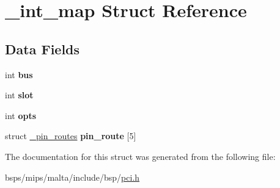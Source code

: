 \hypertarget{struct__int__map}{}\section{\+\_\+int\+\_\+map Struct Reference}
\label{struct__int__map}
\subsection*{Data Fields}
\begin{DoxyCompactItemize}
\item 
\mbox{\label{struct__int__map_a7511193a9cf00d7cb85b575dfb954155}} 
int {\bfseries bus}
\item 
\mbox{\label{struct__int__map_a32e47e1ae9738ea193451df31ee1490d}} 
int {\bfseries slot}
\item 
\mbox{\label{struct__int__map_a8c6b4429bf03063a8a54ee26ce636588}} 
int {\bfseries opts}
\item 
\mbox{\label{struct__int__map_a2cd41ba20b0944c90f945b9ece88ddc2}} 
struct \mbox{\hyperlink{struct__pin__routes}{\+\_\+pin\+\_\+routes}} {\bfseries pin\+\_\+route} \mbox{[}5\mbox{]}
\end{DoxyCompactItemize}


The documentation for this struct was generated from the following file\+:\begin{DoxyCompactItemize}
\item 
bsps/mips/malta/include/bsp/\mbox{\hyperlink{bsps_2mips_2malta_2include_2bsp_2pci_8h}{pci.\+h}}\end{DoxyCompactItemize}
